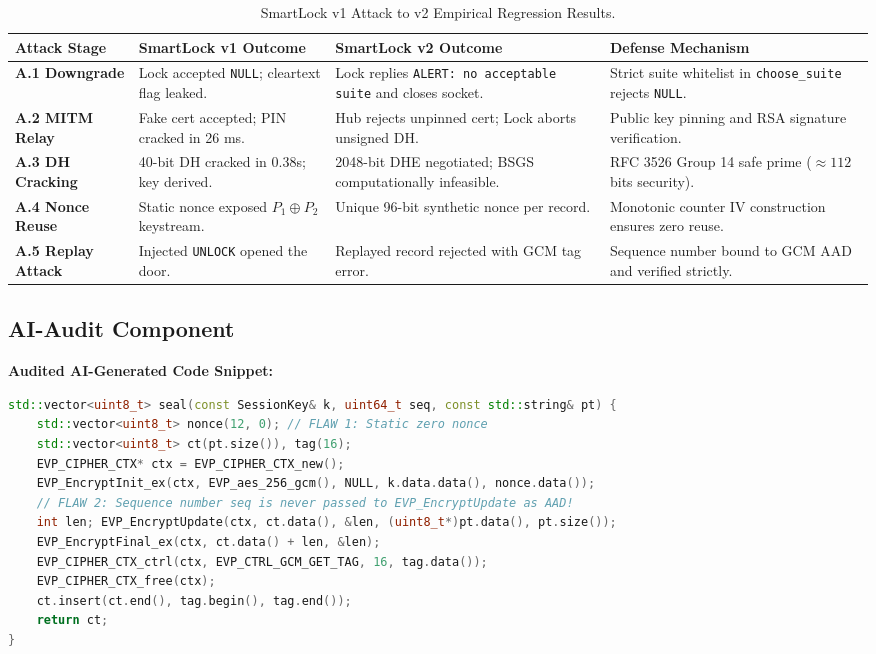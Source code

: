 \documentclass[11pt,a4paper]{article}
\begin{document}
\begin{table}[h!]
\centering
\small
\renewcommand{\arraystretch}{1.3}
\begin{tabular}{p{2.5cm}p{4.2cm}p{4.2cm}p{4.5cm}}
\toprule
\textbf{Attack Stage} & \textbf{SmartLock v1 Outcome} & \textbf{SmartLock v2 Outcome} & \textbf{Defense Mechanism} \\
\midrule
\textbf{A.1 Downgrade} & Lock accepted \texttt{NULL}; cleartext flag leaked. & Lock replies \texttt{ALERT: no acceptable suite} and closes socket. & Strict suite whitelist in \texttt{choose\_suite} rejects \texttt{NULL}. \\
\textbf{A.2 MITM Relay} & Fake cert accepted; PIN cracked in 26 ms. & Hub rejects unpinned cert; Lock aborts unsigned DH. & Public key pinning and RSA signature verification. \\
\textbf{A.3 DH Cracking} & 40-bit DH cracked in 0.38s; key derived. & 2048-bit DHE negotiated; BSGS computationally infeasible. & RFC 3526 Group 14 safe prime ($\approx 112$ bits security). \\
\textbf{A.4 Nonce Reuse} & Static nonce exposed $P_1 \oplus P_2$ keystream. & Unique 96-bit synthetic nonce per record. & Monotonic counter IV construction ensures zero reuse. \\
\textbf{A.5 Replay Attack} & Injected \texttt{UNLOCK} opened the door. & Replayed record rejected with GCM tag error. & Sequence number bound to GCM AAD and verified strictly. \\
\bottomrule
\end{tabular}
\caption{SmartLock v1 Attack to v2 Empirical Regression Results.}
\end{table}

\subsection{AI-Audit Component}
\textbf{Audited AI-Generated Code Snippet:}
\begin{lstlisting}[language=C++]
std::vector<uint8_t> seal(const SessionKey& k, uint64_t seq, const std::string& pt) {
    std::vector<uint8_t> nonce(12, 0); // FLAW 1: Static zero nonce
    std::vector<uint8_t> ct(pt.size()), tag(16);
    EVP_CIPHER_CTX* ctx = EVP_CIPHER_CTX_new();
    EVP_EncryptInit_ex(ctx, EVP_aes_256_gcm(), NULL, k.data.data(), nonce.data());
    // FLAW 2: Sequence number seq is never passed to EVP_EncryptUpdate as AAD!
    int len; EVP_EncryptUpdate(ctx, ct.data(), &len, (uint8_t*)pt.data(), pt.size());
    EVP_EncryptFinal_ex(ctx, ct.data() + len, &len);
    EVP_CIPHER_CTX_ctrl(ctx, EVP_CTRL_GCM_GET_TAG, 16, tag.data());
    EVP_CIPHER_CTX_free(ctx);
    ct.insert(ct.end(), tag.begin(), tag.end());
    return ct;
}
\end{lstlisting}
\end{document}

